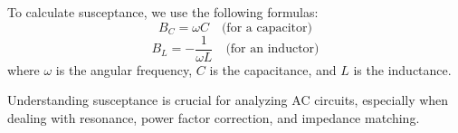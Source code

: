 To calculate susceptance, we use the following formulas:
\[
B_C = \omega C \quad \text{(for a capacitor)}
\]
\[
B_L = -\frac{1}{\omega L} \quad \text{(for an inductor)}
\]
where \(\omega\) is the angular frequency, \(C\) is the capacitance, and \(L\) is the inductance.

Understanding susceptance is crucial for analyzing AC circuits, especially when dealing with resonance, power factor correction, and impedance matching.

